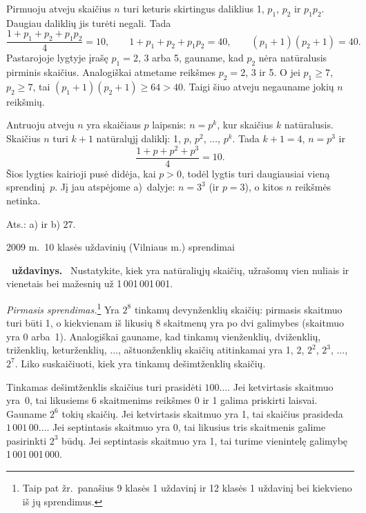 \documentclass[11pt,a4paper]{article}
\newcounter{uzdavinys}
\newenvironment{uzdavinys}
  {\refstepcounter{uzdavinys}\par\medskip\noindent\textbf{\theuzdavinys\ uždavinys.}\ }
  {\par\medskip}
\begin{document}
Pirmuoju atveju skaičius $n$ turi keturis skirtingus daliklius 1, $p_1$, $p_2$ ir $p_1p_2$. Daugiau daliklių jis turėti negali. Tada
$$\frac{1+p_1+p_2+p_1p_2}{4}=10,\qquad1+p_1+p_2+p_1p_2=40,\qquad(p_1+1)(p_2+1)=40.$$
Pastarojoje lygtyje įrašę $p_1=2$, 3 arba 5, gauname, kad $p_2$ nėra natūralusis pirminis skaičius. Analogiškai atmetame reikšmes $p_2=2$, 3 ir 5. O jei $p_1\geq7$, $p_2\geq7$, tai $(p_1+1)(p_2+1)\geq64>40$. Taigi šiuo atveju negauname jokių $n$ reikšmių.

Antruoju atveju $n$ yra skaičiaus $p$ laipsnis: $n=p^k$, kur skaičius $k$ natūralusis. Skaičius $n$ turi $k+1$ natūralųjį daliklį: 1, $p$, $p^2$, $\ldots$, $p^{k}$. Tada $k+1=4$, $n=p^3$ ir
$$\frac{1+p+p^2+p^3}{4}=10.$$
Šios lygties kairioji pusė didėja, kai $p>0$, todėl lygtis turi daugiausiai vieną sprendinį~$p$. Jį jau atspėjome a)~dalyje: $n=3^3$ (ir $p=3$), o kitos $n$ reikšmės netinka.

\begin{flushright}
Ats.: a) ir b) $27$.
\end{flushright}
 \vspace{0,7cm}

\begin{center}\label{dvu}
{\sc\large 2009 m.~10 klasės uždavinių (Vilniaus m.) sprendimai}
\end{center}
\vspace{0,3cm}


\setcounter{uzdavinys}{0}


\begin{uzdavinys}
Nustatykite, kiek yra natūraliųjų skaičių, užrašomų vien nuliais ir vienetais bei mažesnių už 1\,001\,001\,001.
\end{uzdavinys}

\textit{Pirmasis sprendimas.}\footnote{Taip pat žr.~panašius 9 klasės 1 uždavinį ir 12 klasės 1 uždavinį bei kiekvieno iš jų sprendimus.} Yra $2^8$ tinkamų devynženklių skaičių: pirmasis skaitmuo turi būti 1, o kiekvienam iš likusių 8 skaitmenų yra po dvi galimybes (skaitmuo yra 0 arba~1). Analogiškai gauname, kad tinkamų vienženklių, dviženklių, triženklių, keturženklių, $\ldots$, aštuonženklių skaičių atitinkamai yra 1, 2, $2^2$, $2^3$, $\ldots$, $2^7$. Liko suskaičiuoti, kiek yra tinkamų dešimtženklių skaičių.

Tinkamas dešimtženklis skaičius turi prasidėti $100\ldots$. Jei ketvirtasis skaitmuo yra~0, tai likusiems 6 skaitmenims reikšmes 0 ir 1 galima priskirti laisvai. Gauname $2^6$ tokių skaičių.  Jei ketvirtasis skaitmuo yra 1, tai skaičius prasideda $1\,001\,00\ldots$. Jei septintasis skaitmuo yra 0, tai likusius tris skaitmenis galime pasirinkti $2^3$ būdų. Jei septintasis skaitmuo yra 1, tai turime vienintelę galimybę 1\,001\,001\,000.
\end{document}
